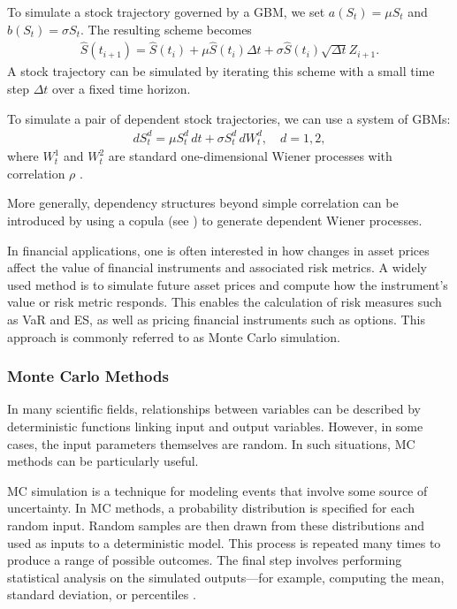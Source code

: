To simulate a stock trajectory governed by a \gls{GBM}, we set $a(S_t) = \mu S_t$ and $b(S_t) = \sigma S_t$. The resulting scheme becomes
\begin{align*}
    \hat{S}(t_{i+1}) = \hat{S}(t_i) + \mu \hat{S}(t_i) \Delta t + \sigma \hat{S}(t_i) \sqrt{\Delta t} Z_{i+1}.
\end{align*}
A stock trajectory can be simulated by iterating this scheme with a small time step $\Delta t$ over a fixed time horizon.

To simulate a pair of dependent stock trajectories, we can use a system of \gls{GBM}s:
\begin{align*}
    dS_t^d = \mu S_t^d \,dt + \sigma S_t^d \,dW_t^d, \quad d = 1, 2,
\end{align*}
where $W_t^1$ and $W_t^2$ are standard one-dimensional Wiener processes with correlation $\rho$ \citep[p.~104]{glasserman2004monte}.

More generally, dependency structures beyond simple correlation can be introduced by using a copula (see ) to generate dependent Wiener processes.

In financial applications, one is often interested in how changes in asset prices affect the value of financial instruments and associated risk metrics. A widely used method is to simulate future asset prices and compute how the instrument's value or risk metric responds. This enables the calculation of risk measures such as \gls{VaR} and \gls{ES}, as well as pricing financial instruments such as options. This approach is commonly referred to as Monte Carlo simulation.

\subsubsection{Monte Carlo Methods} \label{sec:MonteCarlo}
In many scientific fields, relationships between variables can be described by deterministic functions linking input and output variables. However, in some cases, the input parameters themselves are random. In such situations, \gls{MC} methods can be particularly useful.

\gls{MC} simulation is a technique for modeling events that involve some source of uncertainty. In \gls{MC} methods, a probability distribution is specified for each random input. Random samples are then drawn from these distributions and used as inputs to a deterministic model. This process is repeated many times to produce a range of possible outcomes. The final step involves performing statistical analysis on the simulated outputs—for example, computing the mean, standard deviation, or percentiles \citep[pp.~91--92]{Raychaudhuri2008}.

